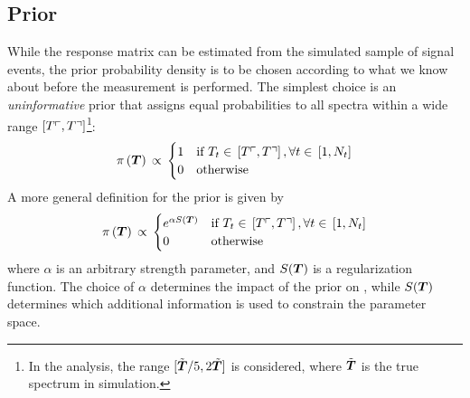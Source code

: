 \subsection{Prior}
\label{sec:fbuprior}
While the response matrix can be estimated from the simulated
sample of signal events, the prior probability density \prior{} is to
be chosen according to what we know about \Truth{} before the
measurement is performed.
The simplest choice is an {\it uninformative}
prior that assigns equal probabilities to all \Truth{} spectra within
a wide range $\left[T\ulcorner{}{}, T\urcorner{}{}\right]$\footnote{In the analysis,
the range $[\tilde{\boldsymbol{T}{}}/5, 2\tilde{\boldsymbol{T}}]$ is considered, where
$\tilde{\boldsymbol{T}{}}$ is the true spectrum in simulation.}:
\begin{equation}
\pi{}\left(\boldsymbol{T}{}\right){}
\propto{}
\begin{cases}
1 & \text{if }
T_{t}\in{}\left[T\ulcorner{}{}, T\urcorner{}{}\right], \forall{}t\in{}\left[1, N_t\right] \\
0 & \text{otherwise} \\
\end{cases}
\end{equation}
A more general definition for the prior is given by 
\begin{equation}
\pi{}\left(\boldsymbol{T}{}\right){}
\propto{}
\begin{cases}
e^{\alpha{}S(\boldsymbol{T}{})} & \text{if }
T_{t}\in{}\left[T\ulcorner{}{}, T\urcorner{}{}\right], \forall{}t\in{}\left[1, N_t\right] \\
0 & \text{otherwise} \\
\end{cases}
\end{equation}
where $\alpha{}$ is an arbitrary strength parameter, and
$S(\boldsymbol{T}{})$ is a regularization function.
The choice of $\alpha$ determines the impact of the prior on
\conditionalProb{\Truth{}}{\Data{}}, while $S(\boldsymbol{T}{})$ determines
which additional information is used to constrain the parameter
space.

